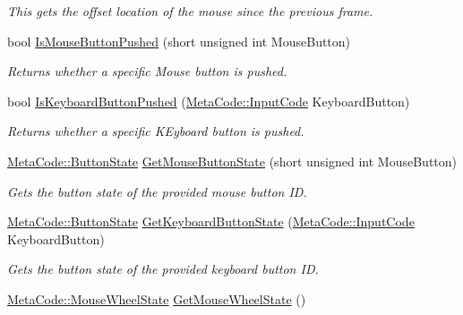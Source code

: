 \begin{DoxyCompactItemize}
\begin{DoxyCompactList}\small\item\em This gets the offset location of the mouse since the previous frame. \item\end{DoxyCompactList}\item 
bool \hyperlink{classphys_1_1InputQueryTool_aab9a7be4d95289d828378f7f3d5fc065}{IsMouseButtonPushed} (short unsigned int MouseButton)
\begin{DoxyCompactList}\small\item\em Returns whether a specific Mouse button is pushed. \item\end{DoxyCompactList}\item 
bool \hyperlink{classphys_1_1InputQueryTool_a6f210acb5f4e2fe052b0c3c7c3ec9418}{IsKeyboardButtonPushed} (\hyperlink{classphys_1_1MetaCode_a3e501cbb5bf0f6f1fdb7211465bda8d8}{MetaCode::InputCode} KeyboardButton)
\begin{DoxyCompactList}\small\item\em Returns whether a specific KEyboard button is pushed. \item\end{DoxyCompactList}\item 
\hyperlink{classphys_1_1MetaCode_a2fdfb26b3e50ceb0ccc60bfc4c3d6ac2}{MetaCode::ButtonState} \hyperlink{classphys_1_1InputQueryTool_a1ef8b70af163d8bc703fd16c3fcce22d}{GetMouseButtonState} (short unsigned int MouseButton)
\begin{DoxyCompactList}\small\item\em Gets the button state of the provided mouse button ID. \item\end{DoxyCompactList}\item 
\hyperlink{classphys_1_1MetaCode_a2fdfb26b3e50ceb0ccc60bfc4c3d6ac2}{MetaCode::ButtonState} \hyperlink{classphys_1_1InputQueryTool_ad279cce170ff68ba9f343f6b22b2c621}{GetKeyboardButtonState} (\hyperlink{classphys_1_1MetaCode_a3e501cbb5bf0f6f1fdb7211465bda8d8}{MetaCode::InputCode} KeyboardButton)
\begin{DoxyCompactList}\small\item\em Gets the button state of the provided keyboard button ID. \item\end{DoxyCompactList}\item 
\hyperlink{classphys_1_1MetaCode_af9ba277d1ef071be8861e35c2b7d82d6}{MetaCode::MouseWheelState} \hyperlink{classphys_1_1InputQueryTool_a3b4c3475e48025fbffd18ae3b3acddec}{GetMouseWheelState} ()

\end{DoxyCompactItemize}
